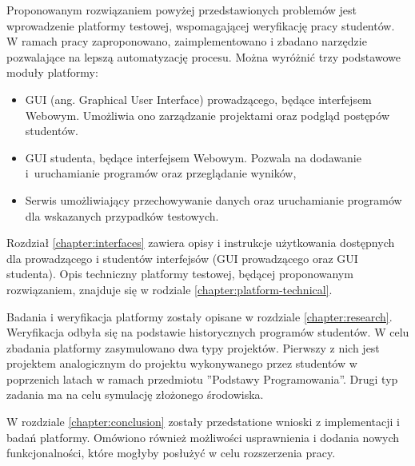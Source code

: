 Proponowanym rozwiązaniem powyżej przedstawionych problemów jest wprowadzenie platformy testowej, wspomagającej weryfikację pracy studentów.
W ramach pracy zaproponowano, zaimplementowano i zbadano narzędzie pozwalające na lepszą automatyzację procesu.
Można wyróżnić trzy podstawowe moduły platformy:
\begin{itemize}
    \item GUI (ang. Graphical User Interface) prowadzącego, będące interfejsem Webowym. Umożliwia ono zarządzanie projektami oraz podgląd postępów studentów.
    \item GUI studenta, będące interfejsem Webowym. Pozwala na dodawanie i~uruchamianie programów oraz przeglądanie wyników,
    \item Serwis umożliwiający przechowywanie danych oraz uruchamianie programów dla wskazanych przypadków testowych.
\end{itemize}
Rozdział \ref{chapter:interfaces} zawiera opisy i instrukcje użytkowania dostępnych dla prowadzącego i studentów interfejsów (GUI prowadzącego oraz GUI studenta).
Opis techniczny platformy testowej, będącej proponowanym rozwiązaniem, znajduje się w rodziale \ref{chapter:platform-technical}.

Badania i weryfikacja platformy zostały opisane w rozdziale \ref{chapter:research}.
Weryfikacja odbyła się na podstawie historycznych programów studentów.
W celu zbadania platformy zasymulowano dwa typy projektów.
Pierwszy z nich jest projektem analogicznym do projektu wykonywanego przez studentów w poprzenich latach w ramach przedmiotu ”Podstawy Programowania”.
Drugi typ zadania ma na celu symulację złożonego środowiska.

W rozdziale \ref{chapter:conclusion} zostały przedstatione wnioski z implementacji i badań platformy.
Omówiono również możliwości usprawnienia i dodania nowych funkcjonalności, które mogłyby posłużyć w celu rozszerzenia pracy.





